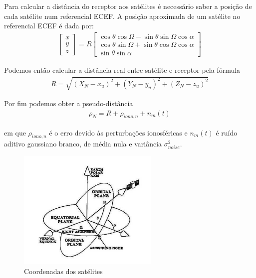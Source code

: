\documentclass[palatino]{ist-report}
\begin{document}
Para calcular a distância do receptor aos satélites é necessário saber a posição de cada satélite num referencial ECEF. A posição aproximada de um satélite no referencial ECEF é dada por:
\begin{gather*}
    \left[\begin{matrix}
        x \\ y \\ z
    \end{matrix}\right]
    = R
    \left[\begin{matrix}
        \cos\theta\cos\Omega - \sin\theta\sin\Omega\cos\alpha \\
        \cos\theta\sin\Omega + \sin\theta\cos\Omega\cos\alpha \\
        \sin\theta\sin\alpha
    \end{matrix}\right]
\end{gather*}

Podemos então calcular a distância real entre satélite e receptor pela fórmula
\begin{gather}\label{eq:rhon}
    R = \sqrt{(X_N - x_u)^2 + (Y_N-y_u)^2 + (Z_N - z_u)^2}
\end{gather}

Por fim podemos obter a pseudo-distância 
\begin{gather}\label{eq:rhon}
    \rho_N = R + \rho_{iono,n} + n_m(t)
\end{gather}

em que $\rho_{iono,n}$ é o erro devido às perturbações ionosféricas e $n_m(t)$ é ruído aditivo gaussiano branco, de média nula e variância $\sigma^2_{noise}$.

\begin{figure}[ht]
	\centering
	\includegraphics[width=0.6\textwidth]{graphics/satelites.png}
	\caption{Coordenadas dos satélites}
	\label{satelite}
\end{figure}
\end{document}
